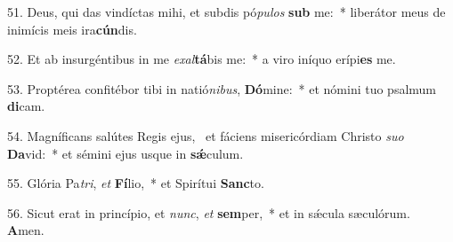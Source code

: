 51. Deus, qui das vindíctas mihi, et subdis pó\textit{pu}\textit{los} \textbf{sub} me:~*  liberátor meus de inimícis meis ira\textbf{cún}dis.\

52. Et ab insurgéntibus in me \textit{ex}\textit{al}\textbf{tá}bis me:~*  a viro iníquo erípi\textbf{es} me.\

53. Proptérea confitébor tibi in natió\textit{ni}\textit{bus}, \textbf{Dó}mine:~*  et nómini tuo psalmum \textbf{di}cam.\

54. Magníficans salútes Regis ejus, \dag\  et fáciens misericórdiam Christo \textit{su}\textit{o} \textbf{Da}vid:~*  et sémini ejus usque in \textbf{sǽ}culum.\

55. Glória Pa\textit{tri}, \textit{et} \textbf{Fí}lio,~*  et Spirítui \textbf{Sanc}to.\

56. Sicut erat in princípio, et \textit{nunc}, \textit{et} \textbf{sem}per,~*  et in sǽcula sæculórum. \textbf{A}men.\


